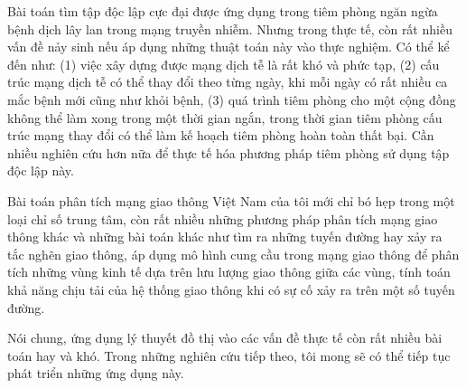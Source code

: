 \documentclass[14pt, oneside, a4paper, openany]{scrartcl}
\begin{document}
Bài toán tìm tập độc lập cực đại được ứng dụng trong tiêm phòng ngăn ngừa bệnh dịch lây lan trong mạng truyền nhiễm. Nhưng trong thực tế, còn rất nhiều vấn đề nảy sinh nếu áp dụng những thuật toán này vào thực nghiệm. Có thể kể đến như: (1) việc xây dựng được mạng dịch tễ là rất khó và phức tạp, (2) cấu trúc mạng dịch tễ có thể thay đổi theo từng ngày, khi mỗi ngày có rất nhiều ca mắc bệnh mới cũng như khỏi bệnh, (3) quá trình tiêm phòng cho một cộng đồng không thể làm xong trong một thời gian ngắn, trong thời gian tiêm phòng cấu trúc mạng thay đổi có thể làm kế hoạch tiêm phòng hoàn toàn thất bại. Cần nhiều nghiên cứu hơn nữa để thực tế hóa phương pháp tiêm phòng sử dụng tập độc lập này.

Bài toán phân tích mạng giao thông Việt Nam của tôi mới chỉ bó hẹp trong một loại chỉ số trung tâm, còn rất nhiều những phương pháp phân tích mạng giao thông khác và những bài toán khác như tìm ra những tuyến đường hay xảy ra tắc nghẽn giao thông, áp dụng mô hình cung cầu trong mạng giao thông để phân tích những vùng kinh tế dựa trên lưu lượng giao thông giữa các vùng, tính toán khả năng chịu tải của hệ thống giao thông khi có sự cố xảy ra trên một số tuyến đường.

Nói chung, ứng dụng lý thuyết đồ thị vào các vấn đề thực tế còn rất nhiều bài toán hay và khó. Trong những nghiên cứu tiếp theo, tôi mong sẽ có thể tiếp tục phát triển những ứng dụng này.
\end{document}
